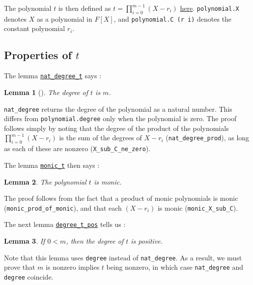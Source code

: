 \documentclass{article}
\newtheorem{lemma}{Lemma}
\theoremstyle{definition}
\theoremstyle{remark}
\begin{document}
The polynomial $t$ is then defined as $t = \prod_{i = 0}^{m - 1} (X - r_i)$ \href{https://github.com/BoltonBailey/formal-snarks-project/blob/7fd9cd122f5887f88f6a706b4f2a68a7153c7381/src/snarks/babysnark/knowledge_soundness.lean#L66}{here}. 
\texttt{polynomial.X} denotes $X$ as a polynomial in $F[X]$, and \texttt{polynomial.C (r i)} denotes the constant polynomial $r_i$.

\subsection{Properties of $t$}
The lemma \href{https://github.com/BoltonBailey/formal-snarks-project/blob/7fd9cd122f5887f88f6a706b4f2a68a7153c7381/src/snarks/babysnark/knowledge_soundness.lean#L71}{\texttt{nat\_degree\_t}} says : 
\theoremstyle{Lemma}
\begin{lemma}[]
  The degree of $t$ is $m$.  
\end{lemma}

\texttt{nat\_degree} returns the degree of the polynomial as a natural number. This differs from \texttt{polynomial.degree} only when the polynomial is zero. 
The proof follows simply by noting that the degree of the product of the polynomials $\prod_{i = 0}^{m - 1} (X - r_i)$ is the sum of the degrees of $X - r_i$ (\texttt{nat\_degree\_prod}), as long as each of these are nonzero (\texttt{X\_sub\_C\_ne\_zero}).

The lemma \href{https://github.com/BoltonBailey/formal-snarks-project/blob/7fd9cd122f5887f88f6a706b4f2a68a7153c7381/src/snarks/babysnark/knowledge_soundness.lean#L82}{\texttt{monic\_t}} then says :
\theoremstyle{lemma}
\begin{lemma}
  The polynomial $t$ is monic.
\end{lemma}
The proof follows from the fact that a product of monic polynomials is monic (\texttt{monic\_prod\_of\_monic}), and that each $(X - r_i)$ is monic (\texttt{monic\_X\_sub\_C}).

The next lemma \href{https://github.com/BoltonBailey/formal-snarks-project/blob/7fd9cd122f5887f88f6a706b4f2a68a7153c7381/src/snarks/babysnark/knowledge_soundness.lean#L91}{\texttt{degree\_t\_pos}} tells us :
\theoremstyle{lemma}
\begin{lemma}
  If $0 < m$, then the degree of $t$ is positive.
\end{lemma}
Note that this lemma uses \texttt{degree} instead of \texttt{nat\_degree}. As a result, we must prove that $m$ is nonzero implies $t$ being nonzero, in which case \texttt{nat\_degree} and \texttt{degree} coincide. 
\end{document}
